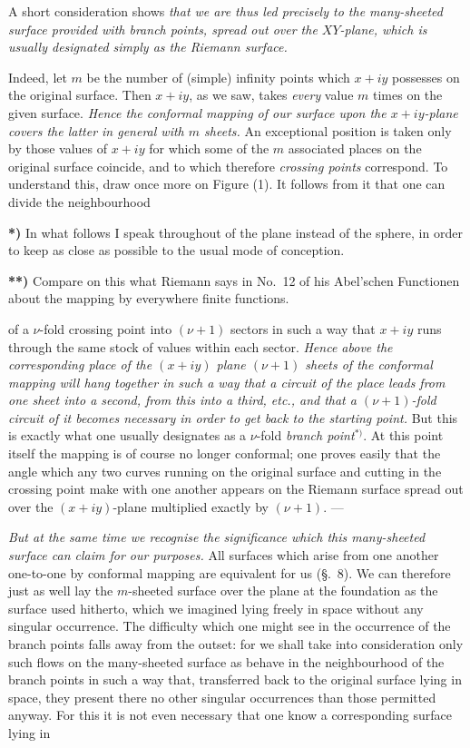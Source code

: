 \documentclass{article}
\begin{document}
A short consideration shows \emph{that we are thus led precisely to the many-sheeted surface provided with branch points, spread out over the $XY$-plane, which is usually designated simply as the Riemann surface.}

Indeed, let $m$ be the number of (simple) infinity points which $x + iy$ possesses on the original surface. Then $x + iy$, as we saw, takes \emph{every} value $m$ times on the given surface. \emph{Hence the conformal mapping of our surface upon the $x + iy$-plane covers the latter in general with $m$ sheets.} An exceptional position is taken only by those values of $x + iy$ for which some of the $m$ associated places on the original surface coincide, and to which therefore \emph{crossing points} correspond. To understand this, draw once more on Figure (1). It follows from it that one can divide the neighbourhood

\textbf{*)} In what follows I speak throughout of the plane instead of the sphere, in order to keep as close as possible to the usual mode of conception.

\textbf{**)} Compare on this what Riemann says in No.~12 of his Abel'schen Functionen about the mapping by everywhere finite functions.

of a $\nu$-fold crossing point into $(\nu + 1)$ sectors in such a way that $x + iy$ runs through the same stock of values within each sector. \emph{Hence above the corresponding place of the $(x + iy)$ plane $(\nu + 1)$ sheets of the conformal mapping will hang together in such a way that a circuit of the place leads from one sheet into a second, from this into a third, etc., and that a $(\nu + 1)$-fold circuit of it becomes necessary in order to get back to the starting point.} But this is exactly what one usually designates as a $\nu$-fold \emph{branch point}${}^{*)}$. At this point itself the mapping is of course no longer conformal; one proves easily that the angle which any two curves running on the original surface and cutting in the crossing point make with one another appears on the Riemann surface spread out over the $(x + iy)$-plane multiplied exactly by $(\nu + 1)$. ---

\emph{But at the same time we recognise the significance which this many-sheeted surface can claim for our purposes.} All surfaces which arise from one another one-to-one by conformal mapping are equivalent for us (§.~8). We can therefore just as well lay the $m$-sheeted surface over the plane at the foundation as the surface used hitherto, which we imagined lying freely in space without any singular occurrence. The difficulty which one might see in the occurrence of the branch points falls away from the outset: for we shall take into consideration only such flows on the many-sheeted surface as behave in the neighbourhood of the branch points in such a way that, transferred back to the original surface lying in space, they present there no other singular occurrences than those permitted anyway. For this it is not even necessary that one know a corresponding surface lying in
\end{document}
